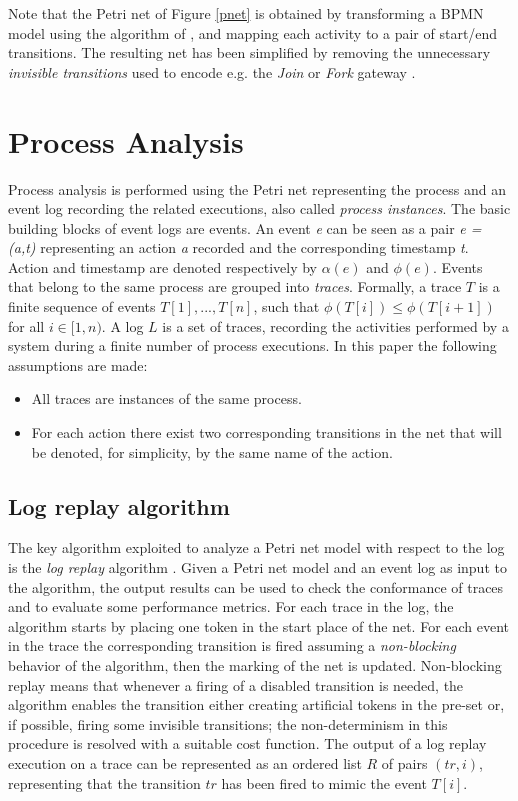 \documentclass{llncs}
\begin{document}
Note that the Petri net of Figure \ref{pnet} is obtained by transforming a BPMN model using the algorithm of \cite{2}, and mapping each activity to a pair of start/end transitions. The resulting net has been simplified by removing the unnecessary \emph{invisible transitions} used to encode e.g. the \emph{Join} or \emph{Fork} gateway \cite{2}.

\section{Process Analysis}\label{Background}

Process analysis is performed using the Petri net representing the process and an event log recording the related executions, also called \emph{process instances}. The basic building blocks of event logs are events. An event {\itshape e} can be seen as a pair {\itshape e = (a,t) } representing an action {\itshape a } recorded and the corresponding timestamp {\itshape t}. Action and timestamp are denoted respectively by $\alpha(e)$ and $\phi(e)$. Events that belong to the same process are grouped into {\itshape traces}. Formally, a trace $T$ is a finite sequence of events $T[1],..., T[n]$, such that $\phi(T[i]) \leq \phi(T[i+1])$ for all  $i \in [1,n)$. A log $L$ is a set of traces, recording the activities performed by a system during a finite number of process executions. In this paper the following assumptions are made:
\begin{itemize}
\item All traces are instances of the same process.
\item For each action there exist two corresponding transitions in the net that will be denoted, for simplicity, by the same name of the action.
\end{itemize}

\subsection{Log replay algorithm}\label{logreplayAlg}

The key algorithm exploited to analyze a Petri net model with respect to the log is the {\itshape log replay} algorithm \cite{13}\cite{3}\cite{4}. Given a Petri net model and an event log as input to the algorithm, the output results can be used to check the conformance of traces and to evaluate some performance metrics. For each trace in the log, the algorithm starts by placing one token in the start place of the net. For each event in the trace the corresponding transition is fired assuming a {\itshape non-blocking} behavior of the algorithm, then the marking of the net is updated. Non-blocking replay means that whenever a firing of a disabled transition is needed, the algorithm enables the transition either creating artificial tokens in the pre-set or, if possible, firing some invisible transitions; the non-determinism in this procedure is resolved with a suitable cost function. The output of a log replay execution on a trace can be represented as an ordered list $R$ of pairs $(tr, i)$, representing that the transition $tr$ has been fired to mimic the event $T[i]$.
\end{document}
